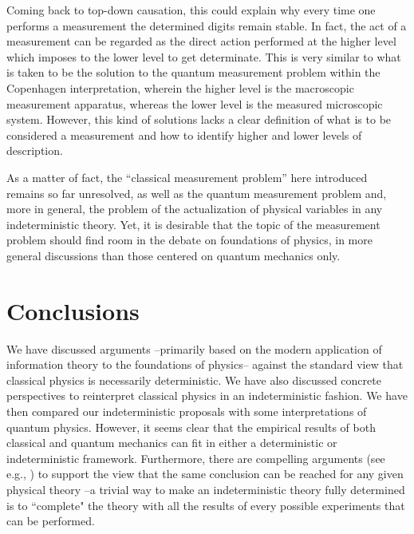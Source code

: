 \documentclass[aps,prl,twocolumn,showpacs,superscriptaddress,groupedaddress, nofootinbib]{revtex4-1}
\begin{document}
Coming back to top-down causation, this could explain why every time one performs a measurement the determined digits remain stable. In fact, the act of a measurement can be regarded as the direct action performed at the higher level which imposes to the lower level to get  determinate. This is very similar to what is taken to be the solution to the quantum measurement problem within the Copenhagen interpretation, wherein the higher level is the macroscopic measurement apparatus, whereas the lower level is the measured microscopic system. However, this kind of solutions lacks a clear definition of what is to be considered a measurement and how to identify higher and lower levels of description.


As a matter of fact, the ``classical measurement problem'' here introduced remains so far unresolved, as well as the quantum measurement problem and, more in general, the problem of the actualization of physical variables in any indeterministic theory. Yet, it is desirable that the topic of the measurement problem should find room in the debate on foundations of physics, in more general discussions than those centered on quantum mechanics only.


\section{Conclusions}

We have discussed arguments --primarily based on the modern application of information theory to the foundations of physics-- against the standard view that classical physics is necessarily deterministic. We have also discussed concrete perspectives to reinterpret classical physics in an indeterministic fashion. We have then compared our indeterministic proposals with some interpretations of quantum physics. However, it seems clear that the empirical results of both classical and quantum mechanics can fit in either a deterministic or indeterministic framework. Furthermore, there are compelling arguments (see e.g., \cite{gisin1, suppes, wendl}) to support the view that the same conclusion can be reached for any given physical theory --a trivial way to make an indeterministic theory fully determined is to ``complete" the theory with all the results of every possible experiments that can be performed.
\end{document}
